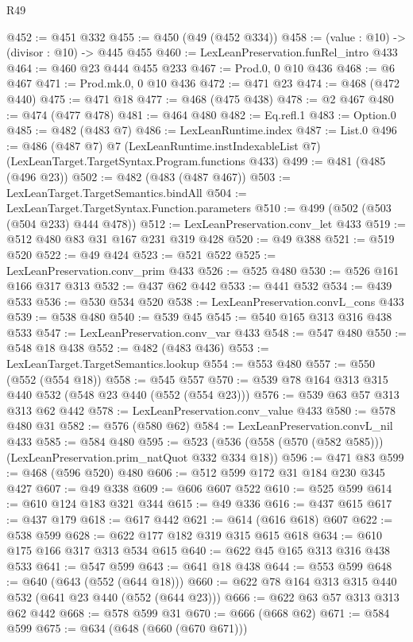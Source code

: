\begin{lexlean}{R49}
\begin{coremodule}
@452 := @451 @332
@455 := @450 (@49 (@452 @334))
@458 := (value : @10) -> (divisor : @10) -> @445 @455
@460 := LexLeanPreservation.funRel_intro @433
@464 := @460 @23 @444 @455 @233
@467 := Prod.{0, 0} @10 @436
@468 := @6 @467
@471 := Prod.mk.{0, 0} @10 @436
@472 := @471 @23
@474 := @468 (@472 @440)
@475 := @471 @18
@477 := @468 (@475 @438)
@478 := @2 @467
@480 := @474 (@477 @478)
@481 := @464 @480
@482 := Eq.refl.{1}
@483 := Option.{0}
@485 := @482 (@483 @7)
@486 := LexLeanRuntime.index
@487 := List.{0}
@496 := @486
    (@487 @7)
    @7
    (LexLeanRuntime.instIndexableList @7)
    (LexLeanTarget.TargetSyntax.Program.functions @433)
@499 := @481 (@485 (@496 @23))
@502 := @482 (@483 (@487 @467))
@503 := LexLeanTarget.TargetSemantics.bindAll
@504 := LexLeanTarget.TargetSyntax.Function.parameters
@510 := @499 (@502 (@503 (@504 @233) @444 @478))
@512 := LexLeanPreservation.conv_let @433
@519 := @512 @480 @83 @31 @167 @231 @319 @428
@520 := @49 @388
@521 := @519 @520
@522 := @49 @424
@523 := @521 @522
@525 := LexLeanPreservation.conv_prim @433
@526 := @525 @480
@530 := @526 @161 @166 @317 @313
@532 := @437 @62 @442
@533 := @441 @532
@534 := @439 @533
@536 := @530 @534 @520
@538 := LexLeanPreservation.convL_cons @433
@539 := @538 @480
@540 := @539 @45
@545 := @540 @165 @313 @316 @438 @533
@547 := LexLeanPreservation.conv_var @433
@548 := @547 @480
@550 := @548 @18 @438
@552 := @482 (@483 @436)
@553 := LexLeanTarget.TargetSemantics.lookup
@554 := @553 @480
@557 := @550 (@552 (@554 @18))
@558 := @545 @557
@570 := @539 @78 @164 @313 @315 @440 @532 (@548 @23 @440 (@552 (@554 @23)))
@576 := @539 @63 @57 @313 @313 @62 @442
@578 := LexLeanPreservation.conv_value @433
@580 := @578 @480 @31
@582 := @576 (@580 @62)
@584 := LexLeanPreservation.convL_nil @433
@585 := @584 @480
@595 := @523 (@536 (@558 (@570 (@582 @585))) (LexLeanPreservation.prim_natQuot @332 @334 @18))
@596 := @471 @83
@599 := @468 (@596 @520) @480
@606 := @512 @599 @172 @31 @184 @230 @345 @427
@607 := @49 @338
@609 := @606 @607 @522
@610 := @525 @599
@614 := @610 @124 @183 @321 @344
@615 := @49 @336
@616 := @437 @615
@617 := @437 @179
@618 := @617 @442
@621 := @614 (@616 @618) @607
@622 := @538 @599
@628 := @622 @177 @182 @319 @315 @615 @618
@634 := @610 @175 @166 @317 @313 @534 @615
@640 := @622 @45 @165 @313 @316 @438 @533
@641 := @547 @599
@643 := @641 @18 @438
@644 := @553 @599
@648 := @640 (@643 (@552 (@644 @18)))
@660 := @622 @78 @164 @313 @315 @440 @532 (@641 @23 @440 (@552 (@644 @23)))
@666 := @622 @63 @57 @313 @313 @62 @442
@668 := @578 @599 @31
@670 := @666 (@668 @62)
@671 := @584 @599
@675 := @634 (@648 (@660 (@670 @671)))

\end{coremodule}
\end{lexlean}
